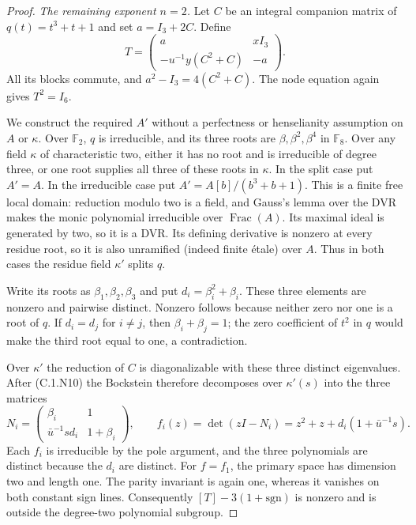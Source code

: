 \begin{proof}
\emph{The remaining exponent $n=2$.}
Let $C$ be an integral companion matrix of
$q(t)=t^3+t+1$ and set $a=I_3+2C$. Define
\[
 T=\begin{pmatrix}
       a&xI_3\\
       -u^{-1}y(C^2+C)&-a
    \end{pmatrix}.                                      \tag{C.1.N12}
\]
All its blocks commute, and
$a^2-I_3=4(C^2+C)$. The node equation again gives $T^2=I_6$.

We construct the required $A'$ without a perfectness or
henselianity assumption on $A$ or $\kappa$.
Over $\mathbb F_2$, $q$ is irreducible, and its three roots
are $\beta,\beta^2,\beta^4$ in $\mathbb F_8$.
Over any field $\kappa$ of characteristic two, either it has
no root and is irreducible of degree three, or one root supplies
all three of these roots in $\kappa$.
In the split case put $A'=A$.
In the irreducible case put
$A'=A[b]/(b^3+b+1)$.
This is a finite free local domain: reduction modulo two is
a field, and Gauss's lemma over the DVR makes the monic
polynomial irreducible over $\operatorname{Frac}(A)$.
Its maximal ideal is generated by two, so it is a DVR.
Its defining derivative is nonzero at every residue root,
so it is also unramified (indeed finite \'etale) over $A$.
Thus in both cases the residue field $\kappa'$ splits $q$.

Write its roots as $\beta_1,\beta_2,\beta_3$ and put
$d_i=\beta_i^2+\beta_i$. These three elements are nonzero
and pairwise distinct. Nonzero follows because neither zero
nor one is a root of $q$. If $d_i=d_j$ for $i\ne j$, then
$\beta_i+\beta_j=1$; the zero coefficient of $t^2$ in $q$
would make the third root equal to one, a contradiction.

Over $\kappa'$ the reduction of $C$ is diagonalizable with
these three distinct eigenvalues. After (C.1.N10) the
Bockstein therefore decomposes over $\kappa'(s)$ into the
three matrices
\[
 N_i=\begin{pmatrix}
        \beta_i&1\\
        \bar u^{-1}s d_i&1+\beta_i
     \end{pmatrix},\qquad
 f_i(z)=\det(zI-N_i)=z^2+z+d_i(1+\bar u^{-1}s).
\]
Each $f_i$ is irreducible by the pole argument, and the three
polynomials are distinct because the $d_i$ are distinct.
For $f=f_1$, the primary space has dimension two and length
one. The parity invariant is again one, whereas it vanishes
on both constant sign lines.
Consequently $[T]-3(1+\mathrm{sgn})$ is nonzero and is outside
the degree-two polynomial subgroup.


\end{proof}
